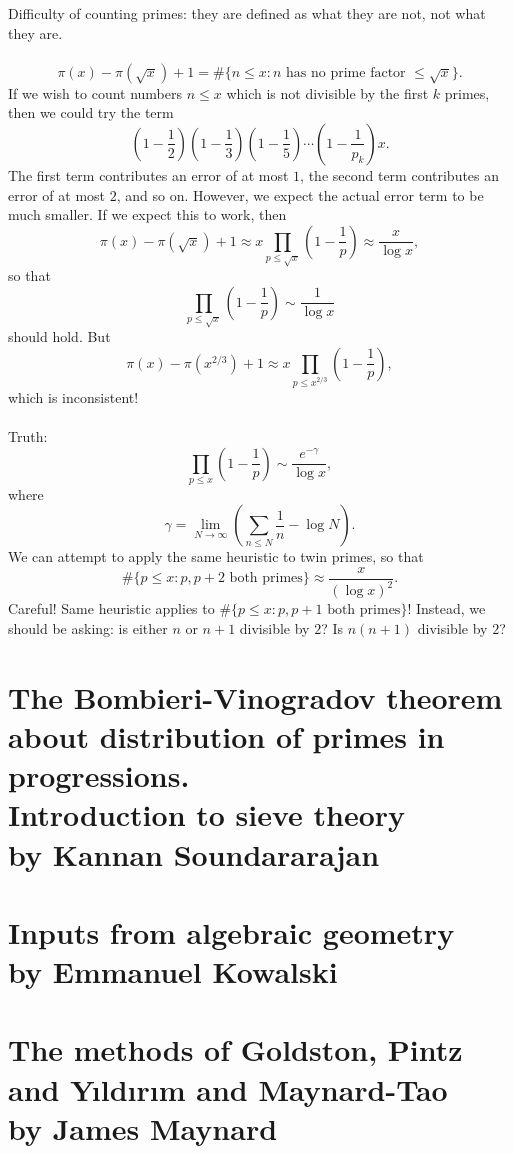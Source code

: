 \documentclass[12pt,amsfont]{amsart}
\begin{document}
Difficulty of counting primes: they are defined as what they are not, not what they are. \\ \\
\[\pi(x) - \pi(\sqrt{x}) + 1 = \#\{n \leq x : n \text{ has no prime factor } \leq \sqrt{x}\}.\]
If we wish to count numbers $n \leq x$ which is not divisible by the first $k$ primes, then we could try the term
\[\left(1 - \frac{1}{2}\right)\left(1 - \frac{1}{3}\right) \left(1 - \frac{1}{5}\right) \cdots \left(1 - \frac{1}{p_k}\right)x.\]
The first term contributes an error of at most $1$, the second term contributes an error of at most $2$, and so on. However, we expect the actual error term to be much smaller. If we expect this to work, then
\[\pi(x) - \pi(\sqrt{x}) + 1 \approx x \prod_{p \leq \sqrt{x}} \left(1 - \frac{1}{p}\right) \approx \frac{x}{\log x},\]
so that
\[\prod_{p \leq \sqrt{x}} \left(1 - \frac{1}{p}\right) \sim \frac{1}{\log x}\]
should hold. But
\[\pi(x) - \pi(x^{2/3}) + 1 \approx x \prod_{p \leq x^{2/3}} \left(1 - \frac{1}{p}\right),\]
which is inconsistent! \\ \\
Truth: 
\[\prod_{p \leq x} \left(1 - \frac{1}{p}\right) \sim \frac{e^{-\gamma}}{\log x},\]
where
\[\gamma = \lim_{N \rightarrow \infty} \left(\sum_{n \leq N} \frac{1}{n} - \log N\right).\]
We can attempt to apply the same heuristic to twin primes, so that
\[\#\{p \leq x : p, p+2 \text{ both primes}\} \approx \frac{x}{(\log x)^2}.\]
Careful! Same heuristic applies to $\# \{p \leq x : p, p+1 \text{ both primes}\}$! Instead, we should be asking: is either $n$ or $n+1$ divisible by $2$? Is $n(n+1)$ divisible by $2$? 

\newpage
\section{The Bombieri-Vinogradov theorem about distribution of primes in progressions. \\Introduction to sieve theory\\by Kannan Soundararajan}\label{2}

\newpage
\section{Inputs from algebraic geometry\\by Emmanuel Kowalski}\label{3}

\newpage
\section{The methods of Goldston, Pintz and Y{\i}ld{\i}r{\i}m and Maynard-Tao\\by James Maynard}\label{4}
\end{document}
